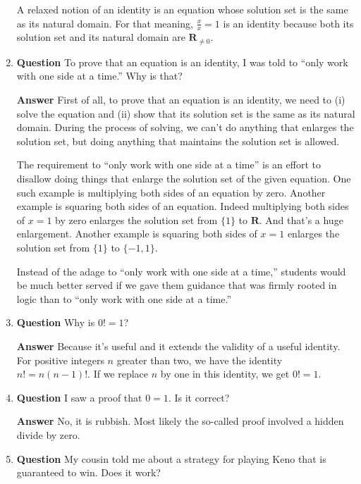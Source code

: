 \documentclass[12pt]{article}
\newcommand{\reals}{\mathbf{R}}
\newcounter{ex}\setcounter{ex}{0}
\begin{document}
\begin{enumerate}
\quad A relaxed notion of an identity is an equation whose
solution set is the same as its natural domain. For that meaning, \(\displaystyle \frac{x}{x} = 1\)
is an identity because both its solution set and its natural domain are \(\reals_{\neq 0}\).

\item \textbf{Question} To prove that an equation is an identity, I was
 told to ``only work with one side at a time.'' Why is that?

 \textbf{Answer} First of all, to prove that an equation is an identity,
 we need to (i) solve the equation and (ii) show that its solution
 set is the same as its natural domain. During the process of solving,
 we can't do anything that enlarges the solution set, but doing anything
 that maintains the solution set is allowed.
 
 \quad The requirement to ``only work with one side at a time''
 is an effort to disallow doing things that enlarge the solution set of
 the given equation. One  such example is multiplying both sides of an equation by zero. Another
 example is squaring both sides of an equation. Indeed multiplying
 both sides of \(x = 1\) by zero enlarges the solution set from \(\{1\}\)
to \(\reals\). And that's a huge enlargement.  Another example is squaring both sides of 
\(x=1\) enlarges the solution set from \(\{1\}\) to \(\{-1,1\}\).

\quad Instead of the adage to ``only work with one side at a time,'' 
students would be much better served if we gave them guidance that was firmly
rooted in logic than to ``only work with one side at a time.'' 

\item  \textbf{Question} Why is \(0! = 1\)?

 \textbf{Answer} Because it's useful and it extends the validity of a useful identity. For positive integers \(n\) greater than two, we have the identity \(n! = n (n-1)!\). If we replace \(n\) by one in this identity, we get \(0! = 1\). 

\item  \textbf{Question} I saw a proof that \(0=1\).  Is it correct?

  \textbf{Answer}  No, it is rubbish. Most likely the so-called proof involved a hidden divide by zero.



\item  \textbf{Question} My cousin told me about a strategy for playing Keno that is guaranteed to win. Does it work?


\end{enumerate}
\end{document}
